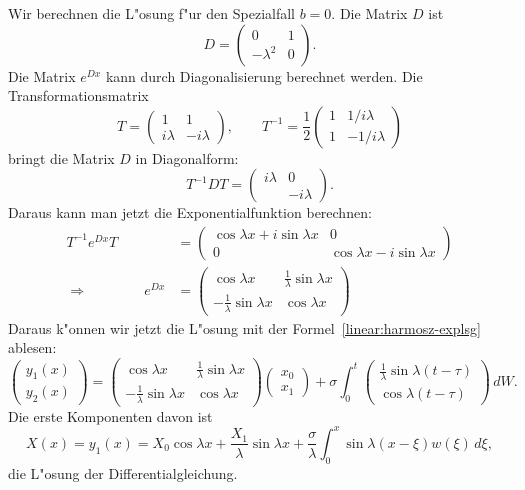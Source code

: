 \begin{beispiel}
Wir berechnen die L"osung f"ur den Spezialfall $b=0$.
Die Matrix $D$ ist
\[
D=\begin{pmatrix}
0&1\\-\lambda^2&0
\end{pmatrix}.
\]
Die Matrix $e^{Dx}$ kann durch Diagonalisierung berechnet werden.
Die Transformationsmatrix
\[
T
=
\begin{pmatrix}
1&1\\
i\lambda&-i\lambda
\end{pmatrix},
\qquad
T^{-1}
=
\frac12
\begin{pmatrix}
1& 1/i\lambda\\
1&-1/i\lambda
\end{pmatrix}
\]
bringt die Matrix $D$ in Diagonalform:
\[
T^{-1}DT
=
\begin{pmatrix}
i\lambda&        0\\
        &-i\lambda
\end{pmatrix}.
\]
Daraus kann man jetzt die Exponentialfunktion berechnen:
\begin{align*}
T^{-1}e^{Dx}T
&=
\begin{pmatrix}
\cos\lambda x+i\sin\lambda x&              0             \\
              0             &\cos\lambda x-i\sin\lambda x
\end{pmatrix}
\\
\Rightarrow\qquad\qquad
e^{Dx}
&=
\begin{pmatrix}
                \cos\lambda x&\frac1{\lambda}\sin\lambda x\\
-\frac1{\lambda}\sin\lambda x&               \cos\lambda x
\end{pmatrix}
\end{align*}
Daraus k"onnen wir jetzt die L"osung mit der
Formel~\eqref{linear:harmosz-explsg} ablesen:
\begin{equation}
\begin{pmatrix}
y_1(x)\\y_2(x)
\end{pmatrix}
=
\begin{pmatrix}
                \cos\lambda x&\frac1{\lambda}\sin\lambda x\\
-\frac1{\lambda}\sin\lambda x&               \cos\lambda x
\end{pmatrix}
\begin{pmatrix}x_0\\x_1\end{pmatrix}
+
\sigma\int_0^t
\begin{pmatrix}
\frac1{\lambda}\sin\lambda(t-\tau)\\
               \cos\lambda(t-\tau)
\end{pmatrix}\,dW.
\end{equation}
Die erste Komponenten davon ist
\begin{equation}
X(x)
=
y_1(x)
=
X_0\cos\lambda x+\frac{X_1}{\lambda}\sin\lambda x
+
\frac{\sigma}{\lambda}\int_0^x\sin\lambda(x-\xi)w(\xi)\,d\xi,
\label{linear:harmosz-y}
\end{equation}
die L"osung der Differentialgleichung.
\end{beispiel}

